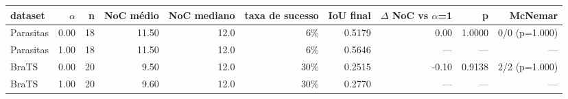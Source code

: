 \begin{tabular}{lrrrrrrrrr}
\hline
dataset & $\alpha$ & n & NoC médio & NoC mediano & taxa de sucesso & IoU final & $\Delta$ NoC vs $\alpha$=1 & p & McNemar \\
\hline
Parasitas & 0.00 & 18 & 11.50 & 12.0 & 6\% & 0.5179 & 0.00 & 1.0000 & 0/0 (p=1.000) \\
Parasitas & 1.00 & 18 & 11.50 & 12.0 & 6\% & 0.5646 & --- & --- & --- \\
BraTS & 0.00 & 20 & 9.50 & 12.0 & 30\% & 0.2515 & -0.10 & 0.9138 & 2/2 (p=1.000) \\
BraTS & 1.00 & 20 & 9.60 & 12.0 & 30\% & 0.2770 & --- & --- & --- \\
\hline
\end{tabular}
